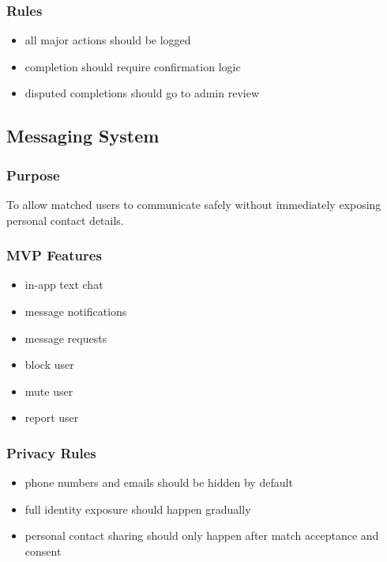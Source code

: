 \documentclass[11pt]{article}
\begin{document}
\subsubsection{Rules}
\begin{itemize}[leftmargin=1.5em]
    \item all major actions should be logged
    \item completion should require confirmation logic
    \item disputed completions should go to admin review
\end{itemize}

\subsection{Messaging System}

\subsubsection{Purpose}
To allow matched users to communicate safely without immediately exposing personal contact details.

\subsubsection{MVP Features}
\begin{itemize}[leftmargin=1.5em]
    \item in-app text chat
    \item message notifications
    \item message requests
    \item block user
    \item mute user
    \item report user
\end{itemize}

\subsubsection{Privacy Rules}
\begin{itemize}[leftmargin=1.5em]
    \item phone numbers and emails should be hidden by default
    \item full identity exposure should happen gradually
    \item personal contact sharing should only happen after match acceptance and consent
\end{itemize}
\end{document}
